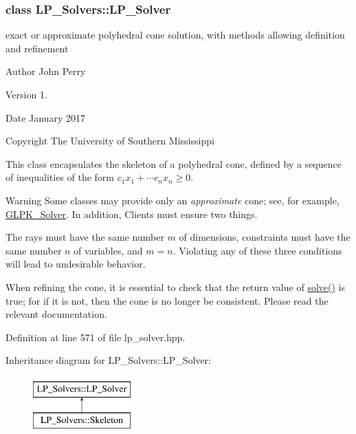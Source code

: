 \label{class_l_p___solvers_1_1_l_p___solver}
\subsubsection{class L\+P\+\_\+\+Solvers\+:\+:L\+P\+\_\+\+Solver}
exact or approximate polyhedral cone solution, with methods allowing definition and refinement 

\begin{DoxyAuthor}{Author}
John Perry 
\end{DoxyAuthor}
\begin{DoxyVersion}{Version}
1. 
\end{DoxyVersion}
\begin{DoxyDate}{Date}
January 2017 
\end{DoxyDate}
\begin{DoxyCopyright}{Copyright}
The University of Southern Mississippi
\end{DoxyCopyright}
This class encapsulates the skeleton of a polyhedral cone, defined by a sequence of inequalities of the form $ c_1 x_1 + \cdots c_n x_n \geq 0 $.

\begin{DoxyWarning}{Warning}
Some classes may provide only an {\itshape approximate} cone; see, for example, \hyperlink{group___c_l_s_solvers_class_l_p___solvers_1_1_g_l_p_k___solver}{G\+L\+P\+K\+\_\+\+Solver}. In addition, Clients must ensure two things.
\begin{DoxyEnumerate}
\item The rays must have the same number $ m $ of dimensions, constraints must have the same number $ n $ of variables, and $ m=n $. Violating any of these three conditions will lead to undesirable behavior.
\item When refining the cone, it is essential to check that the return value of \hyperlink{group___c_l_s_solvers_a8b9979fb228ac9ccfe037ad6ca48b314}{solve()} is {\ttfamily true}; for if it is not, then the cone is no longer be consistent. Please read the relevant documentation. 
\end{DoxyEnumerate}
\end{DoxyWarning}


Definition at line 571 of file lp\+\_\+solver.\+hpp.

Inheritance diagram for L\+P\+\_\+\+Solvers\+:\+:L\+P\+\_\+\+Solver\+:\begin{figure}[H]
\begin{center}
\leavevmode
\includegraphics[height=2.000000cm]{group___c_l_s_solvers}
\end{center}
\end{figure}
